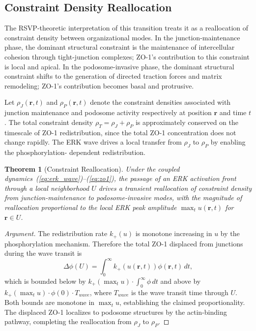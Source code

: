 \documentclass[11pt,a4paper]{article}
\theoremstyle{plain}
\newtheorem{theorem}{Theorem}[section]
\theoremstyle{definition}
\begin{document}
\subsection{Constraint Density Reallocation}

The RSVP-theoretic interpretation of this transition treats it as a reallocation of
constraint density between organizational modes. In the junction-maintenance phase,
the dominant structural constraint is the maintenance of intercellular cohesion through
tight-junction complexes; ZO-1's contribution to this constraint is local and apical.
In the podosome-invasive phase, the dominant structural constraint shifts to the
generation of directed traction forces and matrix remodeling; ZO-1's contribution
becomes basal and protrusive.

Let $\rho_J(\mathbf{r}, t)$ and $\rho_P(\mathbf{r}, t)$ denote the constraint densities
associated with junction maintenance and podosome activity respectively at position
$\mathbf{r}$ and time $t$. The total constraint density
$\rho_T = \rho_J + \rho_P$ is approximately conserved on the timescale of ZO-1
redistribution, since the total ZO-1 concentration does not change rapidly. The ERK
wave drives a local transfer from $\rho_J$ to $\rho_P$ by enabling the phosphorylation-
dependent redistribution.

\begin{theorem}[Constraint Reallocation]
Under the coupled dynamics~(\ref{eq:erk_wave})--(\ref{eq:zo1}), the passage of an ERK
activation front through a local neighborhood $U$ drives a transient reallocation of
constraint density from junction-maintenance to podosome-invasive modes, with the
magnitude of reallocation proportional to the local ERK peak amplitude $\max_t u(\mathbf{r}, t)$
for $\mathbf{r} \in U$.
\end{theorem}

\begin{proof}[Argument]
The redistribution rate $k_+(u)$ is monotone increasing in $u$ by the phosphorylation
mechanism. Therefore the total ZO-1 displaced from junctions during the wave transit
is
\[
\Delta\phi(U) = \int_0^\infty k_+(u(\mathbf{r}, t)) \phi(\mathbf{r}, t) \, dt,
\]
which is bounded below by $k_+(\max_t u) \cdot \int_0^\infty \phi \, dt$ and above by
$k_+(\max_t u) \cdot \phi(0) \cdot T_{wave}$, where $T_{wave}$ is the wave transit time
through $U$. Both bounds are monotone in $\max_t u$, establishing the claimed proportionality.
The displaced ZO-1 localizes to podosome structures by the actin-binding pathway,
completing the reallocation from $\rho_J$ to $\rho_P$.
\end{proof}
\end{document}
